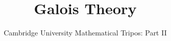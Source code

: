 \documentclass{article}
\title{Galois Theory}
\author{Cambridge University Mathematical Tripos: Part II}
\begin{document}
\maketitle

\tableofcontentsnewpage{}

%
\end{document}
